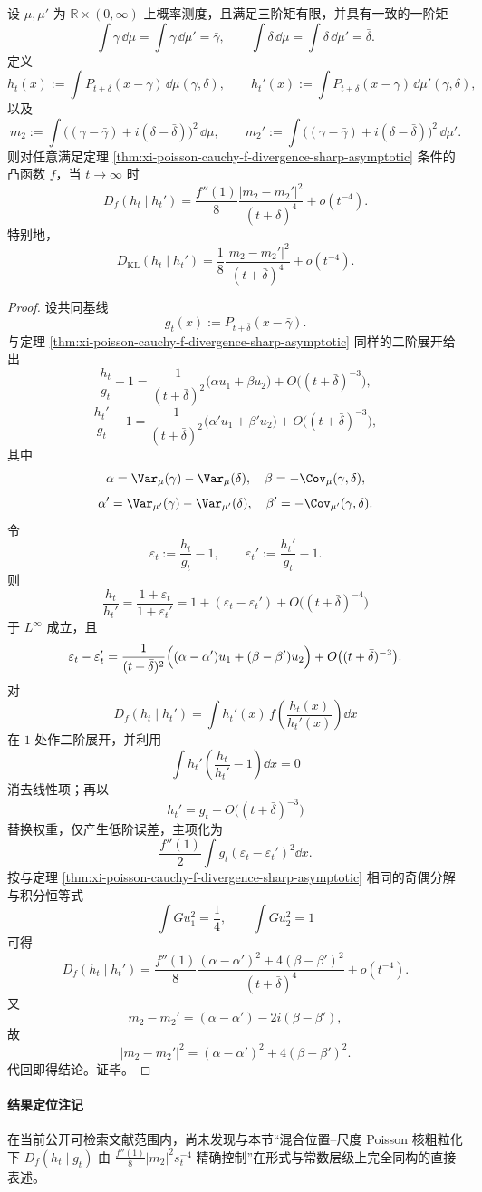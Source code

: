 \begin{theorem}[双缺陷构型在强粗粒化下的可分辨首项]\label{thm:xi-poisson-cauchy-two-mixtures-distinguishability}
设 \(\mu,\mu'\) 为 \(\mathbb R\times(0,\infty)\) 上概率测度，且满足三阶矩有限，并具有一致的一阶矩
\[
\int \gamma\,\dd\mu=\int \gamma\,\dd\mu'=\bar\gamma,
\qquad
\int \delta\,\dd\mu=\int \delta\,\dd\mu'=\bar\delta.
\]
定义
\[
h_t(x):=\int P_{t+\delta}(x-\gamma)\,\dd\mu(\gamma,\delta),
\qquad
h_t'(x):=\int P_{t+\delta}(x-\gamma)\,\dd\mu'(\gamma,\delta),
\]
以及
\[
m_2:=\int\bigl((\gamma-\bar\gamma)+i(\delta-\bar\delta)\bigr)^2\,\dd\mu,
\qquad
m_2':=\int\bigl((\gamma-\bar\gamma)+i(\delta-\bar\delta)\bigr)^2\,\dd\mu'.
\]
则对任意满足定理 \ref{thm:xi-poisson-cauchy-f-divergence-sharp-asymptotic} 条件的凸函数 \(f\)，当 \(t\to\infty\) 时
\[
D_f(h_t\mid h_t')
=\frac{f''(1)}{8}\frac{|m_2-m_2'|^2}{(t+\bar\delta)^4}
+o(t^{-4}).
\]
特别地，
\[
D_{\mathrm{KL}}(h_t\mid h_t')
=\frac{1}{8}\frac{|m_2-m_2'|^2}{(t+\bar\delta)^4}
+o(t^{-4}).
\]
\end{theorem}
\begin{proof}
设共同基线
\[
g_t(x):=P_{t+\bar\delta}(x-\bar\gamma).
\]
与定理 \ref{thm:xi-poisson-cauchy-f-divergence-sharp-asymptotic} 同样的二阶展开给出
\[
\frac{h_t}{g_t}-1
=\frac{1}{(t+\bar\delta)^2}\bigl(\alpha u_1+\beta u_2\bigr)
+O\bigl((t+\bar\delta)^{-3}\bigr),
\]
\[
\frac{h_t'}{g_t}-1
=\frac{1}{(t+\bar\delta)^2}\bigl(\alpha' u_1+\beta' u_2\bigr)
+O\bigl((t+\bar\delta)^{-3}\bigr),
\]
其中
\[
\alpha=\Var_\mu(\gamma)-\Var_\mu(\delta),\quad
\beta=-\Cov_\mu(\gamma,\delta),
\]
\[
\alpha'=\Var_{\mu'}(\gamma)-\Var_{\mu'}(\delta),\quad
\beta'=-\Cov_{\mu'}(\gamma,\delta).
\]
令
\[
\varepsilon_t:=\frac{h_t}{g_t}-1,\qquad
\varepsilon_t':=\frac{h_t'}{g_t}-1.
\]
则
\[
\frac{h_t}{h_t'}
=\frac{1+\varepsilon_t}{1+\varepsilon_t'}
=1+(\varepsilon_t-\varepsilon_t')+O\bigl((t+\bar\delta)^{-4}\bigr)
\]
于 \(L^\infty\) 成立，且
\[
\varepsilon_t-\varepsilon_t'
=\frac{1}{(t+\bar\delta)^2}
\Bigl((\alpha-\alpha')u_1+(\beta-\beta')u_2\Bigr)
+O\bigl((t+\bar\delta)^{-3}\bigr).
\]
对
\[
D_f(h_t\mid h_t')=\int h_t'(x)\,f\!\left(\frac{h_t(x)}{h_t'(x)}\right)\dd x
\]
在 \(1\) 处作二阶展开，并利用
\[
\int h_t'\!\left(\frac{h_t}{h_t'}-1\right)\dd x=0
\]
消去线性项；再以
\[
h_t'=g_t+O\bigl((t+\bar\delta)^{-3}\bigr)
\]
替换权重，仅产生低阶误差，主项化为
\[
\frac{f''(1)}{2}\int g_t(\varepsilon_t-\varepsilon_t')^2\dd x.
\]
按与定理 \ref{thm:xi-poisson-cauchy-f-divergence-sharp-asymptotic} 相同的奇偶分解与积分恒等式
\[
\int G u_1^2=\frac14,\qquad \int G u_2^2=1
\]
可得
\[
D_f(h_t\mid h_t')
=\frac{f''(1)}{8}\frac{(\alpha-\alpha')^2+4(\beta-\beta')^2}{(t+\bar\delta)^4}
+o(t^{-4}).
\]
又
\[
m_2-m_2'=(\alpha-\alpha')-2i(\beta-\beta'),
\]
故
\[
|m_2-m_2'|^2=(\alpha-\alpha')^2+4(\beta-\beta')^2.
\]
代回即得结论。证毕。
\end{proof}

\paragraph{结果定位注记}
在当前公开可检索文献范围内，尚未发现与本节“混合位置--尺度 Poisson 核粗粒化下
\(
D_f(h_t\mid g_t)
\)
由
\(
\frac{f''(1)}{8}|m_2|^2s_t^{-4}
\)
精确控制”在形式与常数层级上完全同构的直接表述。

\endinput
